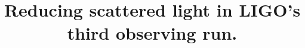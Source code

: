 \documentclass[12pt]{iopart}
\begin{document}






\title{Reducing scattered light in LIGO's third observing run.}






\end{document}
